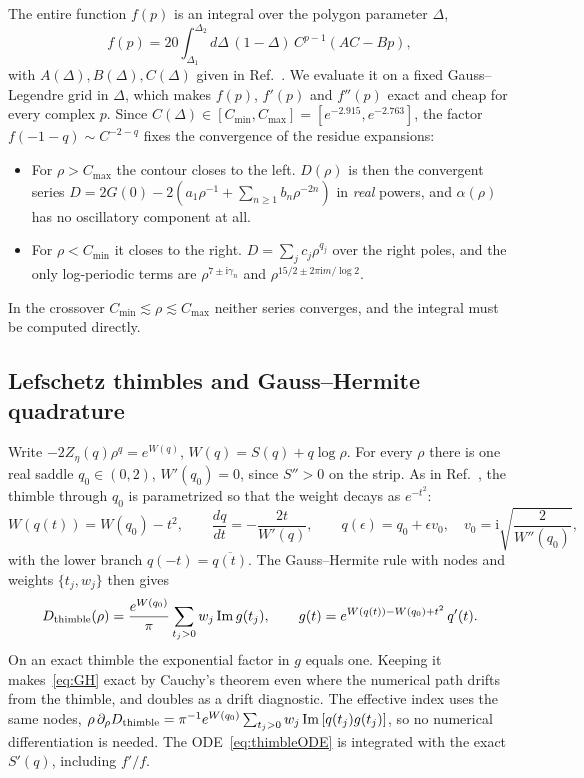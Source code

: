 \documentclass[aip,pof,preprint,floatfix,nofootinbib,amsmath,amssymb]{revtex4-2}
\def\I{\mathrm{i}}
\begin{document}
The entire function $f(p)$ is an integral over the polygon parameter $\Delta$,
\begin{equation}
    f(p)=20\int_{\Delta_1}^{\Delta_2}d\Delta\,(1-\Delta)\,C^{p-1}\left(AC-Bp\right),
    \label{eq:fp}
\end{equation}
with $A(\Delta),B(\Delta),C(\Delta)$ given in Ref.~. We evaluate it on a fixed Gauss--Legendre grid in $\Delta$, which makes $f(p)$, $f'(p)$ and
$f''(p)$ exact and cheap for every complex $p$. Since $C(\Delta)\in[C_{\min},C_{\max}]=[e^{-2.915},e^{-2.763}]$, the factor
$f(-1-q)\sim C^{-2-q}$ fixes the convergence of the residue expansions:
\begin{itemize}
\item For $\rho>C_{\max}$ the contour closes to the left. $D(\rho)$ is then the convergent series
$D=2G(0)-2\left(a_1\rho^{-1}+\sum_{n\ge1}b_n\rho^{-2n}\right)$ in \emph{real} powers, and $\alpha(\rho)$ has no oscillatory component at all.
\item For $\rho<C_{\min}$ it closes to the right. $D=\sum_j c_j\rho^{q_j}$ over the right poles, and the only log-periodic terms
are $\rho^{7\pm\I\gamma_n}$ and $\rho^{15/2\pm2\pi\I m/\log2}$.
\end{itemize}
In the crossover $C_{\min}\lesssim\rho\lesssim C_{\max}$ neither series converges, and the integral must be computed directly.

\subsection{Lefschetz thimbles and Gauss--Hermite quadrature}

Write $-2Z_\eta(q)\rho^q=e^{W(q)}$, $W(q)=S(q)+q\log\rho$. For every $\rho$ there is one real saddle $q_0\in(0,2)$,
$W'(q_0)=0$, since $S''>0$ on the strip. As in Ref.~, the thimble through $q_0$ is parametrized so
that the weight decays as $e^{-t^2}$:
\begin{equation}
    W\left(q(t)\right)=W(q_0)-t^2,\qquad \frac{dq}{dt}=-\frac{2t}{W'(q)},\qquad
    q(\epsilon)=q_0+\epsilon v_0,\quad v_0=\I\sqrt{\frac{2}{W''(q_0)}},
    \label{eq:thimbleODE}
\end{equation}
with the lower branch $q(-t)=\overline{q(t)}$. The Gauss--Hermite rule with nodes and weights $\{t_j,w_j\}$ then gives
\begin{equation}
    D_{\rm thimble}(\rho)=\frac{e^{W(q_0)}}{\pi}\sum_{t_j>0}w_j\,\mathrm{Im}\,g(t_j),\qquad
    g(t)=e^{W(q(t))-W(q_0)+t^2}\,q'(t).
    \label{eq:GH}
\end{equation}
On an exact thimble the exponential factor in $g$ equals one. Keeping it makes~\eqref{eq:GH} exact by Cauchy's theorem even
where the numerical path drifts from the thimble, and doubles as a drift diagnostic. The effective index uses the same
nodes, $\rho\,\partial_\rho D_{\rm thimble}=\pi^{-1}e^{W(q_0)}\sum_{t_j>0}w_j\,\mathrm{Im}\left[q(t_j)g(t_j)\right]$, so no
numerical differentiation is needed. The ODE~\eqref{eq:thimbleODE} is integrated with the exact $S'(q)$, including $f'/f$.
\end{document}
